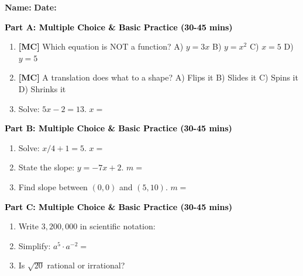 \documentclass[12pt, letterpaper, fleqn]{article}
\newcommand{\blank}{\underline{\hspace{2.2cm}}}
\begin{document}
\textbf{Name:} \underline{\hspace{5cm}}
\hfill
\textbf{Date:} \underline{\hspace{3cm}}\\


\begin{tcolorbox}[colback=customteal!20]
\large\textcolor{black}{\textbf{Part A: Multiple Choice \& Basic Practice (30-45 mins)}}
\end{tcolorbox}

\vspace{3mm}

\begin{enumerate}[itemsep=2.5cm, leftmargin=0.6cm]
\item \textbf{[MC]} Which equation is NOT a function?
A) $y = 3x$ B) $y = x^2$ C) $x = 5$ D) $y = 5$
\item \textbf{[MC]} A translation does what to a shape?
A) Flips it B) Slides it C) Spins it D) Shrinks it
\item Solve: $5x - 2 = 13$. $x =$ \blank
\end{enumerate}

\newpage

\begin{tcolorbox}[colback=customteal!20]
\large\textcolor{black}{\textbf{Part B: Multiple Choice \& Basic Practice (30-45 mins)}}
\end{tcolorbox}

\vspace{3mm}

\begin{enumerate}[itemsep=2.5cm, leftmargin=0.6cm, resume]
\item Solve: $x/4 + 1 = 5$. $x =$ \blank
\item State the slope: $y = -7x + 2$. $m =$ \blank
\item Find slope between $(0,0)$ and $(5, 10)$. $m =$ \blank
\end{enumerate}

\newpage

\begin{tcolorbox}[colback=customteal!20]
\large\textcolor{black}{\textbf{Part C: Multiple Choice \& Basic Practice (30-45 mins)}}
\end{tcolorbox}

\vspace{3mm}

\begin{enumerate}[itemsep=2.5cm, leftmargin=0.6cm, resume]
\item Write $3,200,000$ in scientific notation: \blank
\item Simplify: $a^5 \cdot a^{-2} =$ \blank
\item Is $\sqrt{20}$ rational or irrational? \blank
\end{enumerate}
\end{document}

